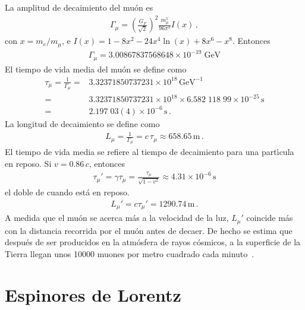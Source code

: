 \begin{frame}
\begin{example}
  La amplitud de decaimiento del mu\'on es
    \begin{align}
      \Gamma_\mu=\left(\frac{G_F}{\sqrt{2}}\right)^2\frac{m_\mu^5}{96\pi^3}I\left(x\right)\,,
    \end{align}
    con $x=m_e/m_\mu$, e $I(x)=1-8x^2-24x^4\ln(x)+8x^6-x^8$.
    Entonces
    \begin{align}
      \Gamma_\mu=3.00867837568648 \times 10^{- 19} \; \text{GeV}
    \end{align}
    El tiempo de vida media del mu\'on se define como
    \begin{align}
      \tau_\mu=\frac{1}{\Gamma_\mu}=&3.32371850737231\times10^{18}\,\text{GeV}^{-1}\nonumber\\
      =&3.32371850737231\times10^{18}\times6.582\;118\;99\times10^{-25}\,\text{s}\nonumber\\
      =&2.197\;03(4)\times10^{-6}\,\text{s}\,.
    \end{align}
La longitud de decaimiento se define como
\begin{align}
  L_\mu=\frac{1}{\Gamma_\mu}=c\,\tau_\mu\approx658.65\,\text{m}\,.
\end{align}
El tiempo de vida media se refiere al tiempo de decaimiento para una part\'\i cula en reposo. Si $v=0.86\,c$, entonces
\begin{align}
  \tau_\mu'=\gamma\tau_\mu=\frac{\tau_\mu}{\sqrt{1-v^2}}\approx4.31\times10^{-6}\,\text{s}
\end{align}
el doble de cuando est\'a en reposo. 
\begin{align}
  L_\mu'=c\tau_\mu'=1290.74\,\text{m}\,.
\end{align}
A medida que el mu\'on se acerca m\'as a la velocidad de la luz, $L_\mu'$ coincide m\'as con la distancia recorrida por el mu\'on antes de decaer. De hecho se estima que despu\'es de ser producidos en la atm\'osfera de rayos c\'osmicos, a la superficie de la Tierra llegan unos 10000 muones por metro cuadrado cada minuto~\cite{muon}.

\end{example}

\end{frame}

\section{Espinores de Lorentz}



